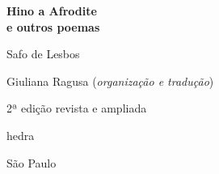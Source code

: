 




\begingroup\thispagestyle{empty}\vspace*{.05\textheight} 

              \formular
              \Huge
              \noindent
              \textbf{Hino a Afrodite\\ e outros poemas}
              
              {\brabo\LARGE
              \noindent Safo de Lesbos}
              
                            \vfill

              {\fontsize{30}{40}\selectfont \minion\small\noindent Giuliana Ragusa (\textit{organização e tradução})}


              \noindent
              {\fontsize{30}{40}\selectfont\minion\small\noindent 2ª edição revista e ampliada}

              \vfill

   \newfontfamily{}
              {\noindent\fontsize{30}{40}\selectfont \timesnewroman hedra}

              \vspace{-0.5cm}
              {\selectfont\minion\small\noindent São Paulo \quad\the\year}

\endgroup
\pagebreak
